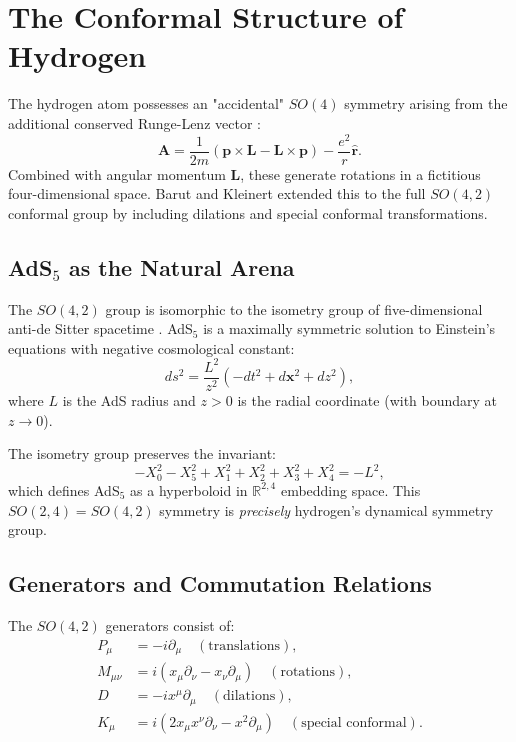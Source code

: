 \documentclass[aps,prd,twocolumn,superscriptaddress,floatfix]{revtex4-2}
\begin{document}
\section{The Conformal Structure of Hydrogen}

The hydrogen atom possesses an "accidental" $SO(4)$ symmetry \cite{pauli1926,fock1935} arising from the additional conserved Runge-Lenz vector \cite{runge1919,lenz1924}:
\begin{equation}
\mathbf{A} = \frac{1}{2m}(\mathbf{p} \times \mathbf{L} - \mathbf{L} \times \mathbf{p}) - \frac{e^2}{r}\mathbf{\hat{r}}.
\end{equation}
Combined with angular momentum $\mathbf{L}$, these generate rotations in a fictitious four-dimensional space. Barut and Kleinert \cite{barut1967} extended this to the full $SO(4,2)$ conformal group by including dilations and special conformal transformations.

\subsection{AdS$_5$ as the Natural Arena}

The $SO(4,2)$ group is isomorphic to the isometry group of five-dimensional anti-de Sitter spacetime \cite{dirac1963,fronsdal1965}. AdS$_5$ is a maximally symmetric solution to Einstein's equations with negative cosmological constant:
\begin{equation}
ds^2 = \frac{L^2}{z^2}\left( -dt^2 + d\mathbf{x}^2 + dz^2 \right),
\label{eq:ads5_metric}
\end{equation}
where $L$ is the AdS radius and $z > 0$ is the radial coordinate (with boundary at $z \to 0$).

The isometry group preserves the invariant:
\begin{equation}
-X_0^2 - X_5^2 + X_1^2 + X_2^2 + X_3^2 + X_4^2 = -L^2,
\end{equation}
which defines AdS$_5$ as a hyperboloid in $\mathbb{R}^{2,4}$ embedding space. This $SO(2,4) = SO(4,2)$ symmetry is \textit{precisely} hydrogen's dynamical symmetry group.

\subsection{Generators and Commutation Relations}

The $SO(4,2)$ generators consist of:
\begin{align}
P_\mu &= -i\partial_\mu \quad (\text{translations}), \\
M_{\mu\nu} &= i(x_\mu \partial_\nu - x_\nu \partial_\mu) \quad (\text{rotations}), \\
D &= -ix^\mu \partial_\mu \quad (\text{dilations}), \\
K_\mu &= i(2x_\mu x^\nu \partial_\nu - x^2 \partial_\mu) \quad (\text{special conformal}).
\end{align}
\end{document}
